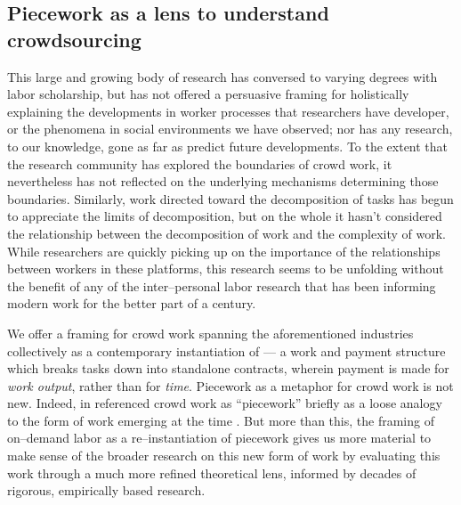 \documentclass[trackingWork]{subfiles}
\begin{document}
\subsection{Piecework as a lens to understand crowdsourcing}
This large and growing body of research has conversed
to varying degrees with labor scholarship,
but has not offered a persuasive framing for holistically explaining
the developments in worker processes that researchers have developer, or
the phenomena in social environments we have observed;
nor has any research, to our knowledge,
gone as far as predict future developments.
To the extent that the research community has explored the boundaries of crowd work,
it nevertheless has not reflected on the underlying mechanisms determining those boundaries.
Similarly, work directed toward the decomposition of tasks has begun to appreciate the limits of decomposition,
but on the whole it hasn't considered the relationship between the decomposition of work and the complexity of work.
While researchers are quickly picking up on the importance of
the relationships between workers in these platforms,
this research seems to be unfolding without the benefit of any of
the inter--personal labor research that has been informing modern work for the better part of a century.

We offer a framing for crowd work spanning the aforementioned industries
collectively as a contemporary instantiation of  ---
a work and payment structure which breaks tasks down into standalone contracts,
wherein payment is made for \textit{work output}, rather than for \textit{time}.
Piecework as a metaphor for crowd work is not new.
Indeed,
\citeauthor{crowdworkFuture} in \citeyear{crowdworkFuture}
referenced crowd work as ``piecework'' briefly
as a loose analogy to the form of work emerging at the time
\cite{crowdworkFuture}.
But more than this,
the framing of on--demand labor as a re--instantiation of piecework
gives us more material to make sense of the broader research on this new form of work
by evaluating this work through a much more refined theoretical lens,
informed by decades of rigorous, empirically based research.
\end{document}
